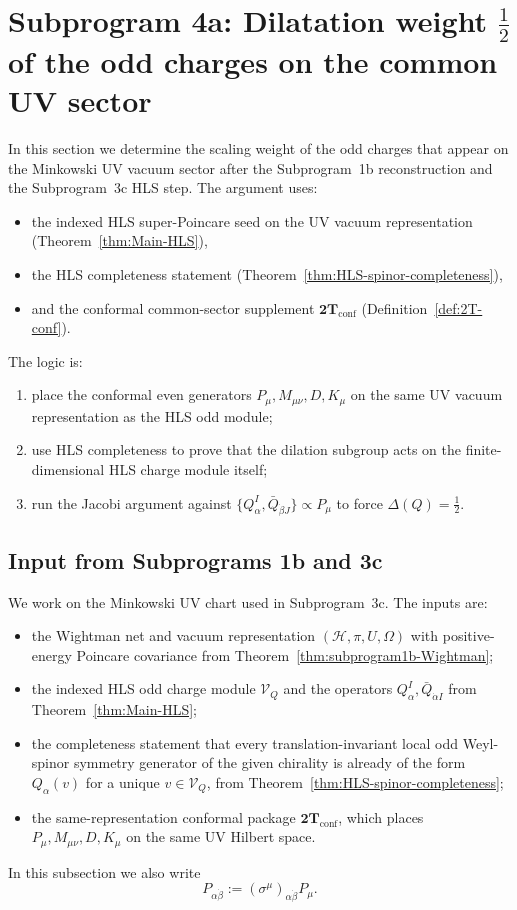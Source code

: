 \section{Subprogram 4a: Dilatation weight \texorpdfstring{$\tfrac12$}{1/2} of the odd charges on the common UV sector}
\label{sec:subprogram4a}

In this section we determine the scaling weight of the odd charges that appear on
the Minkowski UV vacuum sector after the Subprogram~1b reconstruction and the
Subprogram~3c HLS step. The argument uses:
\begin{itemize}
  \item the indexed HLS super-Poincare seed on the UV vacuum representation
        \textnormal{(Theorem~\ref{thm:Main-HLS})},
  \item the HLS completeness statement
        \textnormal{(Theorem~\ref{thm:HLS-spinor-completeness})},
  \item and the conformal common-sector supplement
        \(\mathbf{2T}_{\mathrm{conf}}\)
        \textnormal{(Definition~\ref{def:2T-conf})}.
\end{itemize}
The logic is:
\begin{enumerate}[(1)]
  \item place the conformal even generators \(P_\mu,M_{\mu\nu},D,K_\mu\) on the
        same UV vacuum representation as the HLS odd module;
  \item use HLS completeness to prove that the dilation subgroup acts on the
        finite-dimensional HLS charge module itself;
  \item run the Jacobi argument against
        \(\{Q_\alpha^I,\bar Q_{\dot\beta J}\}\propto P_\mu\) to force
        \(\Delta(Q)=\tfrac12\).
\end{enumerate}

\subsection{Input from Subprograms 1b and 3c}

We work on the Minkowski UV chart used in Subprogram~3c. The inputs are:
\begin{itemize}
  \item the Wightman net and vacuum representation
        \((\mathcal H,\pi,U,\Omega)\) with positive-energy Poincare covariance
        from Theorem~\ref{thm:subprogram1b-Wightman};
  \item the indexed HLS odd charge module \(\mathcal V_Q\) and the operators
        \(Q_\alpha^I,\bar Q_{\dot\alpha I}\) from
        Theorem~\ref{thm:Main-HLS};
  \item the completeness statement that every translation-invariant local odd
        Weyl-spinor symmetry generator of the given chirality is already of the
        form \(Q_\alpha(v)\) for a unique \(v\in\mathcal V_Q\), from
        Theorem~\ref{thm:HLS-spinor-completeness};
  \item the same-representation conformal package
        \(\mathbf{2T}_{\mathrm{conf}}\), which places
        \(P_\mu,M_{\mu\nu},D,K_\mu\) on the same UV Hilbert space.
\end{itemize}
In this subsection we also write
\[
P_{\alpha\dot\beta}:=(\sigma^\mu)_{\alpha\dot\beta}P_\mu.
\]

